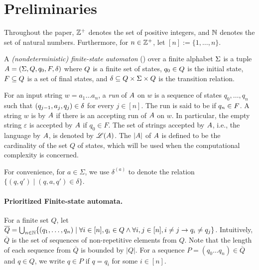 \section{Preliminaries}

Throughout the paper, $\mathbb{Z}^+$ denotes the set of positive integers, and  $\mathbb{N}$ denotes the set of natural numbers. Furthermore, for $n\in \mathbb{Z}^+$, let $[n]:=\{1, \ldots, n\}$. 

\begin{definition} \label{def:nfa}
	A \emph{(nondeterministic) finite-state automaton}
	(\FA{}) over a finite alphabet $\Sigma$ is a tuple ${A} =
	(\Sigma, Q, q_0, F, \delta)$ where 
	$Q$ is a finite set of 
	states, $q_0\in Q$ is
	the initial state, $F\subseteq Q$ is a set of final states, and 
	$\delta\subseteq Q \times 
	\Sigma \times  Q$ is the
	transition relation. 
\end{definition}

For an input string $w=a_1 \dots a_n$, a \emph{run} of ${A}$ on $w$
is a sequence of states $q_0, \ldots, q_n$ such that $(q_{j-1}, a_{j}, q_{j}) \in
\delta$  for every $j \in [n]$.
The run is said to be  if $q_n \in F$.
A string $w$ is  by ${A}$ if there is an accepting run of
${A}$ on $w$. In particular, the empty string $\varepsilon$ is accepted by ${A}$ if $q_0 \in F$. The set of strings accepted by ${A}$, i.e., the language  by ${A}$, is denoted by $\mathscr{L}({A})$.
The  $|{A}|$ of ${A}$ is defined to be the cardinality of the set $Q$ of states, which will be 
used when the computational complexity is concerned.

For convenience, for $a \in \Sigma$, we use $\delta^{(a)}$ to denote the  relation $\{(q, q') \mid (q, a, q') \in \delta\}$.


\paragraph{Prioritized Finite-state automata.}
%
For a finite set $Q$, let $\overline{Q} = \bigcup_{n\in \mathbb{N}}\{ (q_1, \ldots, q_n) \mid \forall i \in [n], q_i \in Q \wedge \forall i,j \in[n], i \neq j \rightarrow q_i \neq q_j \}$. Intuitively, $\overline{Q}$ is the set of sequences of non-repetitive elements from $Q$. Note that the length of each sequence from $\overline{Q}$ is bounded by  $| Q |$. For a sequence $P = (q_0 \ldots q_n) \in \overline{Q}$ and  $q \in Q$, we write $q \in P$ if  $q = q_i$ for some $i \in [n]$. 


